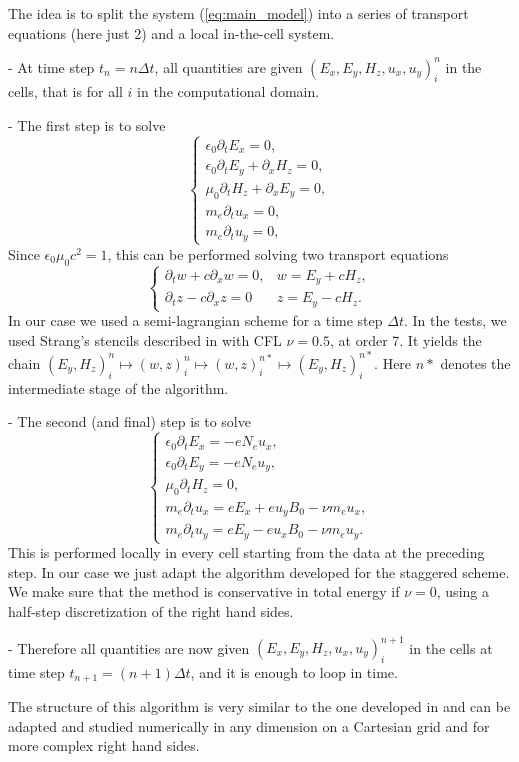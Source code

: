 The idea is to split 
the system (\ref{eq:main_model})
into a series of  transport equations (here just 2) and a local in-the-cell system. 

- At time step $t_n=n\Delta t$, all quantities are given $(E_x,E_y, H_z, u_x,u_y)_{i}^n$ in the cells, that is for all $i$ in the 
computational domain.

- The first step is to solve 
$$
\left\{
\begin{array}{lll}
\epsilon_0\partial_t E_{x}=0,\\
\epsilon_0\partial_t E_{y}+\partial_x H_z=0,\\
\mu_0\partial_t H_z+\partial_x E_y=0,\\
m_e\partial_t u_x=0,\\
m_e\partial_t u_y=0,
\end{array}
\right.
$$
Since  $\epsilon_0 \mu_0c^2=1$, this can be  performed solving
two transport equations 
$$
\left\{
\begin{array}{lll}
\partial_t w +c \partial_x w=0, & w=E_{y}+ c H_z,  \\
\partial_t z -c \partial_x z=0& z=E_{y}-  c H_z.
\end{array}
\right.
$$
In our case we used 
a semi-lagrangian scheme for a time step $\Delta t$.
In the tests, we used Strang's stencils described in \cite{cedar} with CFL $\nu=0.5$, at order 7. 
It  yields the chain 
$(E_y,H_z)_i^n\mapsto ( w,z)_i^n\mapsto ( w,z)_i^{n*}\mapsto (E_y,H_z)_i^{n*} $.
Here $n*$ denotes the intermediate stage of the algorithm.

- The second (and final) step is to solve
$$
\left\{\begin{array}{l}
\epsilon_0\partial_t E_{x}=-eN_e u_x,\\
\epsilon_0\partial_t E_{y}=-eN_e u_y,\\
\mu_0\partial_t H_z=0,\\
m_e\partial_t u_x=eE_x+eu_yB_0-\nu m_e u_x,\\
m_e\partial_t u_y=eE_y-eu_xB_0-\nu m_e u_y.
\end{array}
\right.$$
This is performed locally in every cell starting from the data at the preceding 
step. In our case we just adapt the algorithm developed for the staggered scheme.
We make sure that the method is conservative in total energy if $\nu=0$, using a half-step discretization
of the right hand sides.

- Therefore  all quantities are now given $(E_x,E_y, H_z, u_x,u_y)_{i}^{n+1}$ in the cells 
at time step $t_{n+1}=(n+1)\Delta t$, and it is enough to loop in time.


\begin{remark}
	The structure of this algorithm is very similar to the one developed in \cite{compfluids} and can be adapted and studied numerically
	in any dimension on a Cartesian grid and for more complex right hand sides.
\end{remark}
